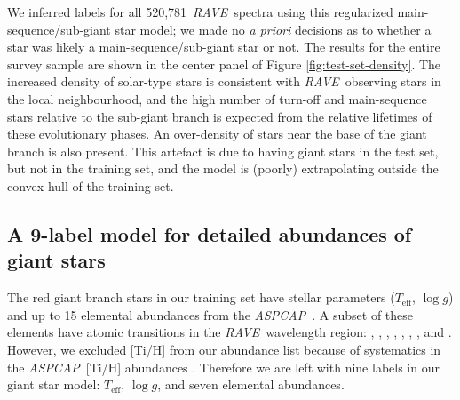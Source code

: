 \documentclass[preprint]{aastex}
\newcommand{\acronym}[1]{{\small{#1}}}
\newcommand{\project}[1]{\textsl{#1}}
\newcommand{\rave}{\project{\acronym{RAVE}}}
\newcommand{\aspcap}{\project{\acronym{ASPCAP}}}
\newcommand{\teff}{T_{\mathrm{eff}}}
\newcommand{\logg}{\log g}
\newcommand{\Nspectra}{520,781}
\begin{document}
We inferred labels for all \Nspectra\ \rave\ spectra using this regularized main-sequence/sub-giant
star model; we made no \emph{a priori} decisions as to whether a star was likely a
main-sequence/sub-giant star or not.  The results for the entire survey sample are shown
in the center panel of Figure \ref{fig:test-set-density}.  The increased density of 
solar-type stars is consistent with \rave\ observing stars in the local neighbourhood, 
and the high number of turn-off and main-sequence stars relative to the sub-giant branch 
is expected from the relative lifetimes of these evolutionary phases.  An over-density
of stars near the base of the giant branch is also present.  This artefact is due 
to having giant stars in the test set, but not in the training set, and the model is 
(poorly) extrapolating outside the convex hull of the training set.


\subsection{A 9-label model for detailed abundances of giant stars}
\label{sec:evolved-star-model}


The red giant branch stars in our training set have stellar parameters 
($\teff$, $\logg$) and up to 15 elemental abundances from the \aspcap\ 
\citep{Garcia_Perez_2016}.  A subset of these elements have atomic transitions in the 
\rave\ wavelength region: \ion{O}{1}, \ion{Mg}{1}, \ion{Al}{1}, \ion{Si}{1}, 
\ion{Ca}{2}, \ion{Ti}{1}, \ion{Fe}{1}, and \ion{Ni}{1}.  However, we 
excluded [Ti/H] from our abundance list because of systematics in the \aspcap\
[Ti/H] abundances \citep{Holtzman_2015,Hawkins_2016}.  Therefore we are left 
with nine labels in our giant star model: $\teff$, $\logg$, and seven elemental 
abundances.  
\end{document}
